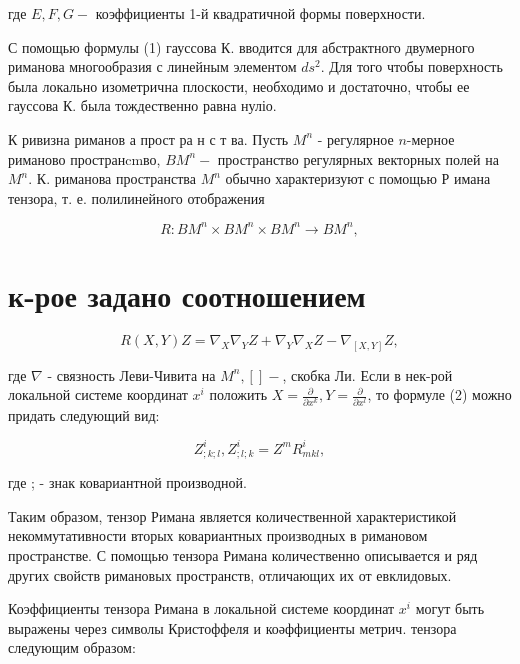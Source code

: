\documentclass[10pt]{article}
\begin{document}
где $E, F, G-$ коэффициенты 1-й квадратичной формы поверхности.



С помощью формулы (1) гауссова К. вводится для абстрактного двумерного риманова многообразия с линейным элементом $d s^{2}$. Для того чтобы поверхность была локально изометрична плоскости, необходимо и достаточно, чтобы ее гауссова К. была тождественно равна нуліо.



К ривизна риманов а прост ра н с т ва. Пусть $M^{n}$ - регулярное $n$-мерное риманово пространcmво, $B M^{n}-$ пространство регулярных векторных полей на $M^{n}$. К. риманова пространства $M^{n}$ обычно характеризуют с помощью Р имана тензора, т. е. полилинейного отображения



\[

R: B M^{n} \times B M^{n} \times B M^{n} \longrightarrow B M^{n},

\]



\section{к-рое задано соотношением}

\[

R(X, Y) Z=\nabla_{X} \nabla_{Y} Z+\nabla_{Y} \nabla_{X} Z-\nabla_{[X, Y]} Z,

\]



где $\nabla$ - связность Леви-Чивита на $M^{n},[]-$, скобка Ли. Если в нек-рой локальной системе координат $x^{i}$ положить $X=\frac{\partial}{\partial x^{k}}, Y=\frac{\partial}{\partial x^{l}}$, то формуле (2) можно придать следующий вид:



\[

Z_{; k ; l}^{i}, Z_{; l ; k}^{i}=Z^{m} R_{m k l}^{i},

\]



где ; - знак ковариантной производной.



Таким образом, тензор Римана является количественной характеристикой некоммутативности вторых ковариантных производных в римановом пространстве. С помощью тензора Римана количественно описывается и ряд других свойств римановых пространств, отличающих их от евклидовых.



Коэффициенты тензора Римана в локальной системе координат $x^{i}$ могут быть выражены через символы Кристоффеля и коәффициенты метрич. тензора следующим образом:
\end{document}
